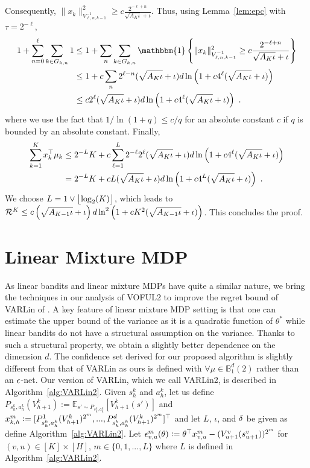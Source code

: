 \documentclass{article}
\def\one{\mathbbm{1}}
\def\onec#1{\one\cbr{#1}}
\newcommand{\blue}[1]{{\color[rgb]{.3,.5,1}#1}}
\renewcommand{\blue}[1]{#1}
\begin{document}
Consequently,
$
  \|x_k\|^2_{V_{\ell,n,k-1}^{-1}} \ge c\frac{2^{-\ell+n}}{\sqrt{A_K\iota}+\iota}
$.
Thus, using Lemma~\ref{lem:epc} with $\tau = 2^{-\ell}$,
\begin{align*}
    1+\sum_{n=0}^\ell \sum_{k\in G_{k,n} } 1 
  &\le 1+\sum_n \sum_{k\in G_{k,n} } \onec{\|x_k\|^2_{V_{\ell,n,k-1}^{-1}} \ge c\frac{2^{-\ell+n}}{\sqrt{A_K\iota}+\iota}}
  \\&\le 1+ c \sum_n 2^{\ell-n} (\sqrt{A_K\iota} +\iota)d\ln\del{1 + c 4^\ell(\sqrt{A_K \iota}+\iota)}    
  \\&\le c 2^{\ell} (\sqrt{A_K\iota} +\iota)d\ln\del{1 + c 4^\ell(\sqrt{A_K \iota}+\iota)}~.
\end{align*}
where we use the fact that $1/\ln(1+q) \le c/q$ for an absolute constant $c$ if $q$ is bounded by an absolute constant. 
Finally,
\begin{align*}
  \sum_{k=1}^K x_k^\T \mu_k   
&\le 2^{-L} K + c \sum_{\ell=1}^L 2^{-\ell} 2^{\ell} (\sqrt{A_K\iota} +\iota)d\ln\del{1 + c 4^\ell(\sqrt{A_K \iota}+\iota)}
\\&= 2^{-L} K + c L(\sqrt{A_K\iota} +\iota)d\ln\del{1 + c 4^L(\sqrt{A_K \iota}+\iota)}~.
\end{align*}
We choose ${L} = 1 \vee \left\lfloor \log_2(K) \right\rfloor$, which leads to 
$
\mathcal{R}^K  
\le 
  c \del{\sqrt{A_{K-1}\iota} + \iota} 
  d \ln^2\del{1 + cK^2(\sqrt{A_{K-1}\iota} + \iota)}
$.
This concludes the proof.

\section{Linear Mixture MDP}
\label{sec:lmmdp}

As linear bandits and linear mixture MDPs have quite a similar nature, we bring the techniques in our analysis of VOFUL2 to improve the regret bound of VARLin of \citet{zhang21variance}. 
A key feature of linear mixture MDP setting is that one can estimate the upper bound of the variance as it is a quadratic function of $\theta^*$ while linear bandits do not have a structural assumption on the variance.
Thanks to such a structural property, we obtain a slightly better dependence on the dimension $d$. 
The confidence set derived for our proposed algorithm is slightly different from that of VARLin as ours is defined with $\forall \mu \in \mathbb{B}_1^d(2)$ rather than an $\epsilon$-net.
Our version of VARLin, which we call VARLin2, is described in Algorithm~\ref{alg:VARLin2}. 
Given $s_h^k$ and $a_h^k$, let us define $P_{s_h^k,a_h^k}(V_{h+1}^k):=\mathbb{E}_{s'\sim P_{s_h^k,a_h^k}}[V_{h+1}^k(s')]$ and $\blue{x_{k,h}^m} := [P^1_{s_h^k,a_h^k}(V_{h+1}^k)^{2^m},...,P_{s_h^k,a_h^k}^d(V_{h+1}^k)^{2^m}]^\T$ and let $L$, $\iota$, and ${\delta}$ be given as define Algorithm~\ref{alg:VARLin2}. 
Let $\blue{\eps_{v,u}^m(\th)} := \th^\T x_{v,u}^m - (V_{u+1}^v(s_{u+1}^v))^{2^m}$ for $(v,u)\in [K]\times [H]$, $m \in \{0,1,...,L\}$ where $L$ is defined in Algorithm~\ref{alg:VARLin2}.
\end{document}
